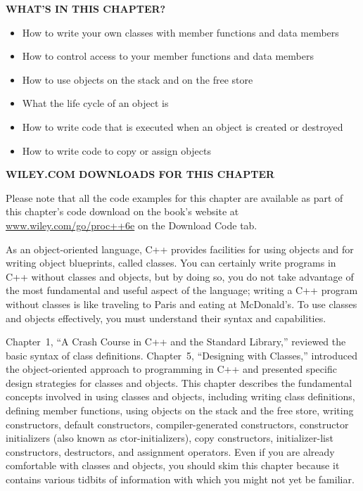 \noindent
\textbf{WHAT’S IN THIS CHAPTER?}

\begin{itemize}
\item
How to write your own classes with member functions and data members

\item
How to control access to your member functions and data members

\item
How to use objects on the stack and on the free store

\item
What the life cycle of an object is

\item
How to write code that is executed when an object is created or destroyed

\item
How to write code to copy or assign objects
\end{itemize}

\noindent
\textbf{WILEY.COM DOWNLOADS FOR THIS CHAPTER}

Please note that all the code examples for this chapter are available as part of this chapter’s code download on the book’s website at \url{www.wiley.com/go/proc++6e} on the Download Code tab.

As an object-oriented language, C++ provides facilities for using objects and for writing object blueprints, called classes. You can certainly write programs in C++ without classes and objects, but by doing so, you do not take advantage of the most fundamental and useful aspect of the language; writing a C++ program without classes is like traveling to Paris and eating at McDonald’s. To use classes and objects effectively, you must understand their syntax and capabilities.

Chapter 1, “A Crash Course in C++ and the Standard Library,” reviewed the basic syntax of class definitions. Chapter 5, “Designing with Classes,” introduced the object-oriented approach to programming in C++ and presented specific design strategies for classes and objects. This chapter describes the fundamental concepts involved in using classes and objects, including writing class definitions, defining member functions, using objects on the stack and the free store, writing constructors, default constructors, compiler-generated constructors, constructor initializers (also known as ctor-initializers), copy constructors, initializer-list constructors, destructors, and assignment operators. Even if you are already comfortable with classes and objects, you should skim this chapter because it contains various tidbits of information with which you might not yet be familiar.























